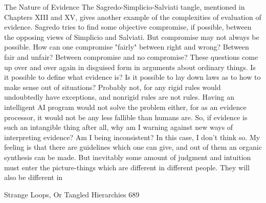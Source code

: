                                The Nature of Evidence
The Sagredo-Simplicio-Salviati tangle, mentioned in Chapters XIII and XV, gives
another example of the complexities of evaluation of evidence. Sagredo tries to find some
objective compromise, if possible, between the opposing views of Simplicio and Salviati.
But compromise may not always be possible. How can one compromise "fairly" between
right and wrong? Between fair and unfair? Between compromise and no compromise?
These questions come up over and over again in disguised form in arguments about
ordinary things.
        Is it possible to define what evidence is? Is it possible to lay down laws as to how
to make sense out of situations? Probably not, for any rigid rules would undoubtedly have
exceptions, and nonrigid rules are not rules. Having an intelligent AI program would not
solve the problem either, for as an evidence processor, it would not be any less fallible
than humans are. So, if evidence is such an intangible thing after all, why am I warning
against new ways of interpreting evidence? Am I being inconsistent? In this case, I don't
think so. My feeling is that there are guidelines which one can give, and out of them an
organic synthesis can be made. But inevitably some amount of judgment and intuition
must enter the picture-things which are different in different people. They will also be
different in




Strange Loops, Or Tangled Hierarchies                                                    689

